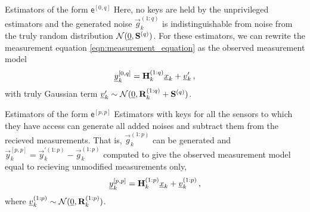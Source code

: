 \documentclass[conference]{IEEEtran}
\theoremstyle{definition}
\theoremstyle{remark}
\begin{document}
\begin{LaTeXdescription}
  \item[Estimators of the form $\mathsf{e}^{[0,q]}$] Here, no keys are held by the unprivileged estimators and the generated noise $\vec{g}_k^{(1:q)}$ is indistinguishable from noise from the truly random distribution $\mathcal{N}({\underline{0}}, {{\mathbf{S}}}^{(q)})$. For these estimators, we can rewrite the measurement equation \eqref{eqn:measurement_equation} as the observed measurement model
  \begin{equation}\label{eqn:0q_obs_measurement_model}
    \vec{y}_k^{[0,q]} = \mat{H}_k^{(1:q)}\vec{x}_k + \vec{v}_k^{\prime}\,,
  \end{equation}
  with truly Gaussian term ${\underline{v}}_k^{\prime} \sim \mathcal{N}({\underline{0}}, {{\mathbf{R}}}_k^{(1:q)}+{{\mathbf{S}}}^{(q)})$.
  
  \item[Estimators of the form $\mathsf{e}^{[p,p]}$] Estimators with keys for all the sensors to which they have access can generate all added noises and subtract them from the recieved measurements. That is, $\vec{g}_k^{(1:p)}$ can be generated and $\vec{y}_k^{[p,p]}=\vec{y}_k^{\prime(1:p)}-\vec{g}_k^{(1:p)}$ computed to give the observed measurement model equal to recieving unmodified measurements only,
  \begin{equation}\label{eqn:pp_obs_measurement_model}
    \vec{y}_k^{[p,p]} = \mat{H}_k^{(1:p)}\vec{x}_k + \vec{v}_k^{(1:p)}\,,
  \end{equation}
  where ${\underline{v}}_k^{(1:p)} \sim \mathcal{N}({\underline{0}}, {{\mathbf{R}}}_k^{(1:p)})$.


\end{LaTeXdescription}
\end{document}
